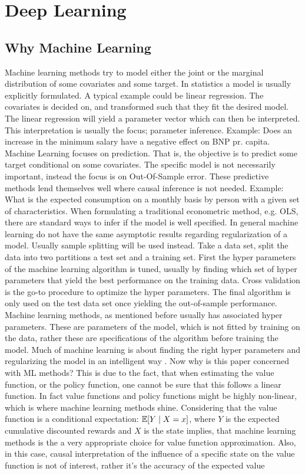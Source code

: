 \section{Deep Learning}
\label{sec:deep_learning}


\subsection{Why Machine Learning}

Machine learning methods try to model either the joint or the marginal distribution of some covariates and some target. In statistics a model is usually explicitly formulated. A typical example could be linear regression. The covariates is decided on, and transformed such that they fit the desired model. The linear regression will yield a parameter vector which can then be interpreted. This interpretation is usually the focus; parameter inference. Example: Does an increase in the minimum salary have a negative effect on BNP pr. capita. Machine Learning focuses on prediction. That is, the objective is to predict some target conditional on some covariates. The specific model is not necessarily important, instead the focus is on Out-Of-Sample error. These predictive methods lend themselves well where causal inference is not needed. Example: What is the expected consumption on a monthly basis by person with a given set of characteristics. When formulating a traditional econometric method, e.g. OLS, there are standard ways to infer if the model is well specified. In general machine learning do not have the same asymptotic results regarding regularization of a model. Usually sample splitting will be used instead. Take a data set, split the data into two partitions a test set and a training set. First the hyper parameters of the machine learning algorithm is tuned, usually by finding which set of hyper parameters that yield the best performance on the training data. Cross validation is the go-to procedure to optimize the hyper parameters. The final algorithm is only used on the test data set once yielding the out-of-sample performance. Machine learning methods, as mentioned before usually has associated hyper parameters. These are parameters of the model, which is not fitted by training on the data, rather these are specifications of the algorithm before training the model. Much of machine learning is about finding the right hyper parameters and regularizing the model in an intelligent way \parencite{friedman_elements_2001}. Now why is this paper concerned with ML methods? This is due to the fact, that when estimating the value function, or the policy function, one cannot be sure that this follows a linear function. In fact value functions and policy functions might be highly non-linear, which is where machine learning methods shine. Considering that the value function is a conditional expectation: $ \mathbb{E}[Y \mid X=x]$, where $Y$ is the expected cumulative discounted rewards and $X$ is the state implies, that machine learning methods is the a very appropriate choice for value function approximation. Also, in this case, causal interpretation of the influence of a specific state on the value function is not of interest, rather it's the accuracy of the expected value 